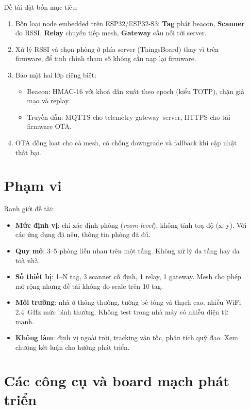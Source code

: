 Đề tài đặt bốn mục tiêu:

\begin{enumerate}
    \item Bốn loại node embedded trên ESP32/ESP32-S3: \textbf{Tag} phát beacon, \textbf{Scanner} đo RSSI, \textbf{Relay} chuyển tiếp mesh, \textbf{Gateway} cầu nối tới server.
    \item Xử lý RSSI và chọn phòng ở phía server (ThingsBoard) thay vì trên firmware, để tinh chỉnh tham số không cần nạp lại firmware.
    \item Bảo mật hai lớp riêng biệt:
    \begin{itemize}
        \item Beacon: HMAC-16 với khoá dẫn xuất theo epoch (kiểu TOTP), chặn giả mạo và replay.
        \item Truyền dẫn: MQTTS cho telemetry gateway--server, HTTPS cho tải firmware OTA.
    \end{itemize}
    \item OTA đồng loạt cho cả mesh, có chống downgrade và fallback khi cập nhật thất bại.
\end{enumerate}

\section{Phạm vi}

Ranh giới đề tài:

\begin{itemize}
    \item \textbf{Mức định vị}: chỉ xác định phòng (\textit{room-level}), không tính toạ độ (x, y). Với các ứng dụng đã nêu, thông tin phòng đã đủ.
    \item \textbf{Quy mô}: 3--5 phòng liền nhau trên một tầng. Không xử lý đa tầng hay đa toà nhà.
    \item \textbf{Số thiết bị}: 1--N tag, 3 scanner cố định, 1 relay, 1 gateway. Mesh cho phép mở rộng nhưng đề tài không đo scale trên 10 tag.
    \item \textbf{Môi trường}: nhà ở thông thường, tường bê tông và thạch cao, nhiễu WiFi 2.4~GHz mức bình thường. Không test trong nhà máy có nhiễu điện từ mạnh.
    \item \textbf{Không làm}: định vị ngoài trời, tracking vận tốc, phân tích quỹ đạo. Xem chương kết luận cho hướng phát triển.
\end{itemize}

\section{Các công cụ và board mạch phát triển}

